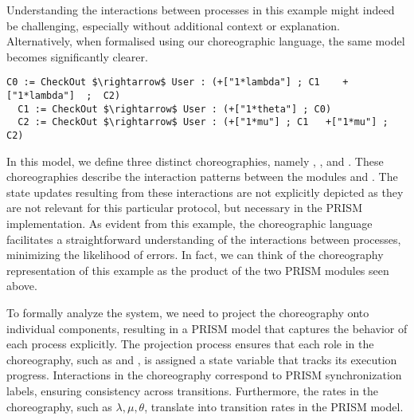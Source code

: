Understanding the interactions between processes in this example might
indeed be challenging, especially without additional context or
explanation.  Alternatively, when formalised using our choreographic
language, the same model becomes significantly clearer.
\begin{lstlisting}[style=chor-color,% caption={Example of Listing \ref{example1} in our choreographic language},captionpos=b,
  frame=none, label={example2}]
  C0 := CheckOut $\rightarrow$ User : (+["1*lambda"] ; C1	 +["1*lambda"]  ;  C2)
  C1 := CheckOut $\rightarrow$ User : (+["1*theta"] ; C0)  
  C2 := CheckOut $\rightarrow$ User : (+["1*mu"] ; C1   +["1*mu"] ;  C2)
\end{lstlisting}
In this model, we define three distinct choreographies, namely
, , and . These choreographies
describe the interaction patterns between the modules 
and . The state updates resulting from these
interactions are not explicitly depicted as they are not relevant for
this particular protocol, but necessary in the PRISM implementation.
%
%
As evident from this example, the choreographic language facilitates a
straightforward understanding of the interactions between processes,
minimizing the likelihood of errors. In fact, we can think of the
choreography representation of this example as the product of the two
PRISM modules seen above.


To formally analyze the system, we need to project the choreography onto individual components, resulting in a PRISM model that captures the behavior of each process explicitly. The projection process ensures that each role in the choreography, such as  and , is assigned a state variable that tracks its execution progress. Interactions in the choreography correspond to PRISM synchronization labels, ensuring consistency across transitions. Furthermore, the rates in the choreography, such as $\lambda, \mu, \theta$, translate into transition rates in the PRISM model.

